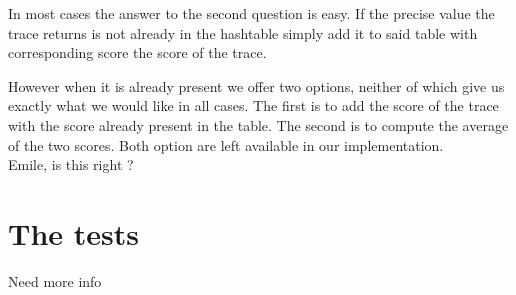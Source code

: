 \documentclass{article}
\newcommand\SC[1]{{\color{violet}{\it \bf Simon :} #1}}
\begin{document}
	In most cases the answer to the second question is easy. If the precise value the trace returns is not already in the hashtable simply add it to said table with corresponding score the score of the trace.

	However when it is already present we offer two options, neither of which give us exactly what we would like in all cases.
	The first is to add the score of the trace with the score already present in the table.
	The second is to compute the average of the two scores.
	Both option are left available in our implementation. \\
	\SC{Emile, is this right ?}

\section{The tests}

\SC{Need more info}
\end{document}

